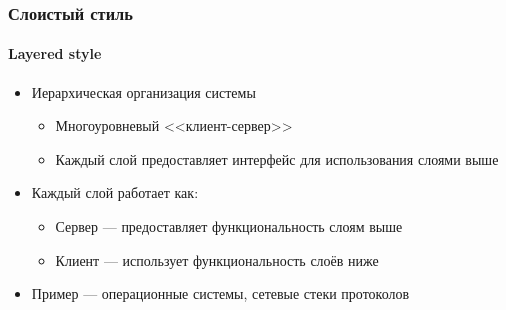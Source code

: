 \documentclass[xetex,mathserif,serif]{beamer}
\begin{document}
    \begin{frame}
        \frametitle{Слоистый стиль}
        \framesubtitle{Layered style}
        \begin{itemize}
            \item Иерархическая организация системы
            \begin{itemize}
                \item Многоуровневый <<клиент-сервер>>
                \item Каждый слой предоставляет интерфейс для использования слоями выше
            \end{itemize}
            \item Каждый слой работает как:
            \begin{itemize}
                \item Сервер --- предоставляет функциональность слоям выше
                \item Клиент --- использует функциональность слоёв ниже
            \end{itemize}
            \item Пример --- операционные системы, сетевые стеки протоколов
        \end{itemize}
    \end{frame}
\end{document}
